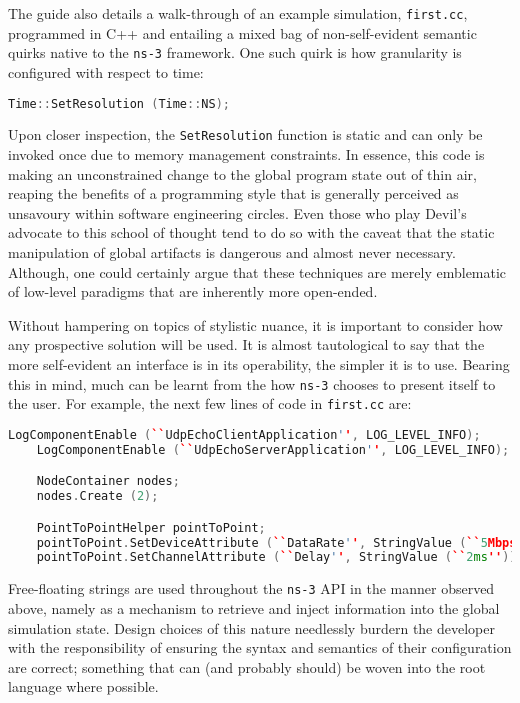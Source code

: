 The guide also details a walk-through of an example simulation, \texttt{first.cc}, programmed in C++ and entailing a
mixed bag of non-self-evident semantic quirks native to the \texttt{ns-3} framework. One such quirk is how
granularity is configured with respect to time:

\begin{lstlisting}[language=C++]
    Time::SetResolution (Time::NS);
\end{lstlisting}

Upon closer inspection, the \texttt{SetResolution} function is static and can only be invoked once due to memory
management constraints. In essence, this code is making an unconstrained change to the global program state out of thin
air, reaping the benefits of a programming style that is generally perceived as unsavoury within software engineering
circles\cite{stack_exchange_static_methods, git_connected_static_methods, medium_static_methods,
    tom_butler_static_methods}. Even those who play Devil's advocate to this school of thought tend to do so with the
caveat that the static manipulation of global artifacts is dangerous and almost never
necessary\cite{java_code_geeks_static_methods}. Although, one could certainly argue that these techniques are merely
emblematic of low-level paradigms that are inherently more open-ended.

Without hampering on topics of stylistic nuance, it is important to consider how any prospective solution will be
used. It is almost tautological to say that the more self-evident an interface is in its operability, the
simpler it is to use. Bearing this in mind, much can be learnt from the how \texttt{ns-3} chooses to present itself to
the user. For example, the next few lines of code in \texttt{first.cc} are:

\begin{lstlisting}[language=C++,firstnumber=2]
    LogComponentEnable (``UdpEchoClientApplication'', LOG_LEVEL_INFO);
    LogComponentEnable (``UdpEchoServerApplication'', LOG_LEVEL_INFO);

    NodeContainer nodes;
    nodes.Create (2);

    PointToPointHelper pointToPoint;
    pointToPoint.SetDeviceAttribute (``DataRate'', StringValue (``5Mbps''));
    pointToPoint.SetChannelAttribute (``Delay'', StringValue (``2ms''));
\end{lstlisting}

Free-floating strings are used throughout the \texttt{ns-3} API in the manner observed above, namely as a mechanism to
retrieve and inject information into the global simulation state. Design choices of this nature needlessly burdern the
developer with the responsibility of ensuring the syntax and semantics of their configuration are correct; something
that can (and probably should) be woven into the root language where possible.


